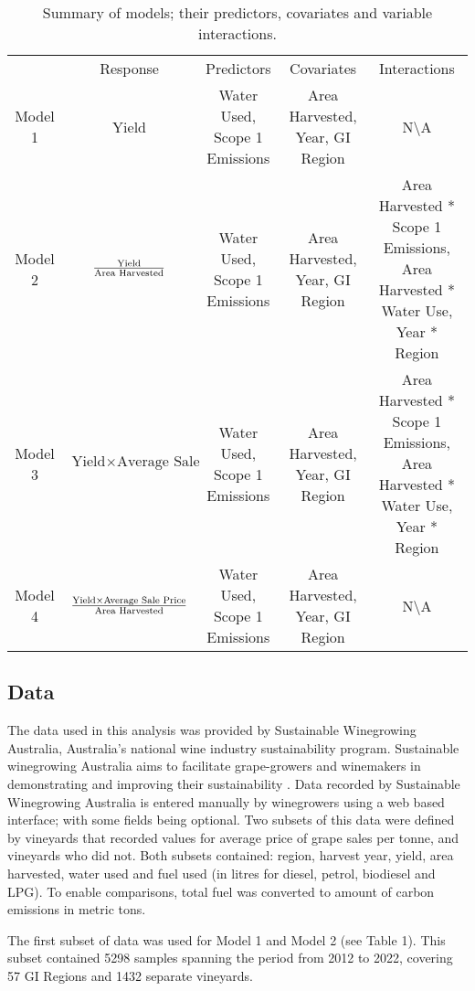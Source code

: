 \documentclass[12pt,australian]{article}
\begin{document}
\begin{sloppypar}
\begin{table}[]
    \begin{center}
      \caption{Summary of models; their predictors, covariates and variable interactions.}
      \label{tab:tab1}
      \begin{tabular}{ccccc}
        & Response & Predictors & Covariates & Interactions \\
        Model 1 & Yield & Water Used, Scope 1 Emissions & Area Harvested, Year, GI Region & N\textbackslash A \\
        Model 2 & ${\text{Yield}}\over{\text{Area Harvested}}$ & Water Used, Scope 1 Emissions & Area Harvested, Year, GI Region & Area Harvested * Scope 1 Emissions, Area Harvested * Water Use, Year * Region \\
        Model 3 & \small{$\text{Yield} {\times} \text{Average Sale Price}$} &  Water Used, Scope 1 Emissions& Area Harvested, Year, GI Region & Area Harvested * Scope 1 Emissions, Area Harvested * Water Use, Year * Region  \\
        Model 4 & ${\text{Yield} \times \text{Average Sale Price}}\over{\text{Area Harvested}}$ & Water Used, Scope 1 Emissions & Area Harvested, Year, GI Region  & N\textbackslash A
      \end{tabular}
    \end{center}
\end{table}

\subsection{Data}
The data used in this analysis was provided by Sustainable Winegrowing Australia, Australia's national wine industry sustainability program. Sustainable winegrowing Australia aims to facilitate grape-growers and winemakers in demonstrating and improving their sustainability \autocite{swaSustainableWingrowingAustralia2022}. Data recorded by Sustainable Winegrowing Australia is entered manually by winegrowers using a web based interface; with some fields being optional. Two subsets of this data were defined by vineyards that recorded values for average price of grape sales per tonne, and vineyards who did not. Both subsets contained: region, harvest year, yield, area harvested, water used and fuel used (in litres for diesel, petrol, biodiesel and LPG). To enable comparisons, total fuel was converted to amount of carbon emissions in metric tons.

The first subset of data was used for Model 1 and Model 2 (see Table 1). This subset contained 5298 samples spanning the period from 2012 to 2022, covering 57 GI Regions and 1432 separate vineyards.


\end{sloppypar}
\end{document}
